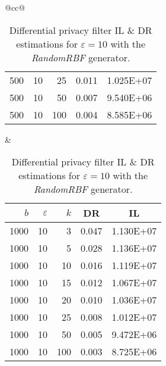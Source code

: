 \begin{table}[H]
\begin{tabular}{@{}cc@{}}
\begin{tabular}{@{}rrrrr@{}}
			500	&	10	&	25	&	0.011	&	1.025E+07 \\
			500	&	10	&	50	&	0.007	&	9.540E+06 \\
			500	&	10	&	100	&	0.004	&	8.585E+06 \\
		\end{tabular}
		&
		\begin{tabular}{@{}rrrrr@{}}
			\toprule
			$b$ & $\varepsilon$ & $k$ & \multicolumn{1}{c}{DR} & \multicolumn{1}{c}{IL} \\ \midrule
			1000	&	10	&	3	&	0.047	&	1.130E+07 \\
			1000	&	10	&	5	&	0.028	&	1.136E+07 \\
			1000	&	10	&	10	&	0.016	&	1.119E+07 \\
			1000	&	10	&	15	&	0.012	&	1.067E+07 \\
			1000	&	10	&	20	&	0.010	&	1.036E+07 \\
			1000	&	10	&	25	&	0.008	&	1.012E+07 \\
			1000	&	10	&	50	&	0.005	&	9.472E+06 \\
			1000	&	10	&	100	&	0.003	&	8.725E+06 \\
		\end{tabular}
	\end{tabular}
	\caption[Differential privacy filter DR \& IL estimations (RandomRBF), $\varepsilon = 10$.]{Differential privacy filter IL \& DR estimations for $\varepsilon = 10$ with the \textit{RandomRBF} generator.}
	\label{table:results-wave-diff-priv-e10}
\end{table}

